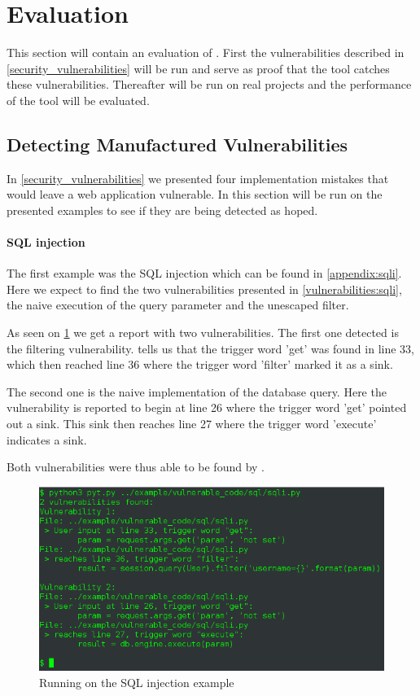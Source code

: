 \section{Evaluation}\label{evaluation}
This section will contain an evaluation of \pyt{}.
First the vulnerabilities described in \cref{security_vulnerabilities} will be run and serve as proof that the tool catches these vulnerabilities.
Thereafter \pyt{} will be run on real projects and the performance of the tool will be evaluated.

\subsection{Detecting Manufactured Vulnerabilities}
In \cref{security_vulnerabilities} we presented four implementation mistakes that would leave a web application vulnerable.
In this section \pyt{} will be run on the presented examples to see if they are being detected as hoped.

\paragraph{SQL injection}
The first example was the SQL injection which can be found in \cref{appendix:sqli}.
Here we expect to find the two vulnerabilities presented in \cref{vulnerabilities:sqli}, the naive execution of the query parameter and the unescaped filter.

As seen on \cref{sqli:console} we get a report with two vulnerabilities.
The first one detected is the filtering vulnerability.
\pyt{} tells us that the trigger word 'get' was found in line 33, which then reached line 36 where the trigger word 'filter' marked it as a sink.

The second one is the naive implementation of the database query.
Here the vulnerability is reported to begin at line 26 where the trigger word 'get' pointed out a sink.
This sink then reaches line 27 where the trigger word 'execute' indicates a sink.

Both vulnerabilities were thus able to be found by \pyt{}.

\begin{figure}
  \includegraphics[width=\textwidth]{./figures/sqli_console.png}
  \caption{Running \pyt{} on the SQL injection example}
  \label{sqli:console}
\end{figure}

